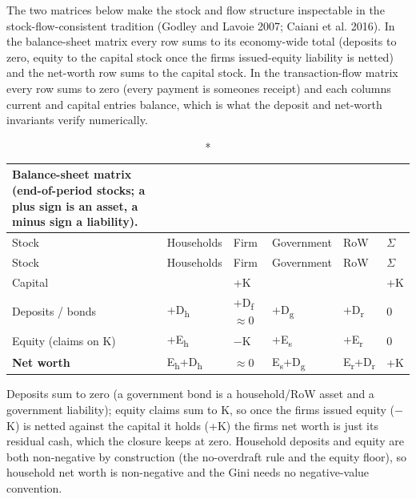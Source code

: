 \documentclass[11pt]{article}
\begin{document}
The two matrices below make the stock and flow structure inspectable in
the stock-flow-consistent tradition (Godley and Lavoie 2007; Caiani et
al. 2016). In the balance-sheet matrix every row sums to its
economy-wide total (deposits to zero, equity to the capital stock once
the firm\textquotesingle s issued-equity liability is netted) and the
net-worth row sums to the capital stock. In the transaction-flow matrix
every row sums to zero (every payment is someone\textquotesingle s
receipt) and each column\textquotesingle s current and capital entries
balance, which is what the deposit and net-worth invariants verify
numerically.

\begin{longtable}[]{@{}llllll@{}}
\caption*{Balance-sheet matrix (end-of-period stocks; a plus sign is an
asset, a minus sign a liability).}\tabularnewline
\toprule\noalign{}
Stock & Households & Firm & Government & RoW & $\Sigma$ \\
\midrule\noalign{}
\endfirsthead
\toprule\noalign{}
Stock & Households & Firm & Government & RoW & $\Sigma$ \\
\midrule\noalign{}
\endhead
\bottomrule\noalign{}
\endlastfoot
Capital & & +K & & & +K \\
Deposits / bonds & +D\textsubscript{h} & +D\textsubscript{f}$\approx$0 &
+D\textsubscript{g} & +D\textsubscript{r} & 0 \\
Equity (claims on K) & +E\textsubscript{h} & $-$K & +E\textsubscript{s} &
+E\textsubscript{r} & 0 \\
\textbf{Net worth} & E\textsubscript{h}+D\textsubscript{h} & $\approx$0 &
E\textsubscript{s}+D\textsubscript{g} &
E\textsubscript{r}+D\textsubscript{r} & +K \\
\end{longtable}

Deposits sum to zero (a government bond is a household/RoW asset and a
government liability); equity claims sum to K, so once the
firm\textquotesingle s issued equity ($-$K) is netted against the capital
it holds (+K) the firm\textquotesingle s net worth is just its residual
cash, which the closure keeps at zero. Household deposits and equity are
both non-negative by construction (the no-overdraft rule and the equity
floor), so household net worth is non-negative and the Gini needs no
negative-value convention.
\end{document}
